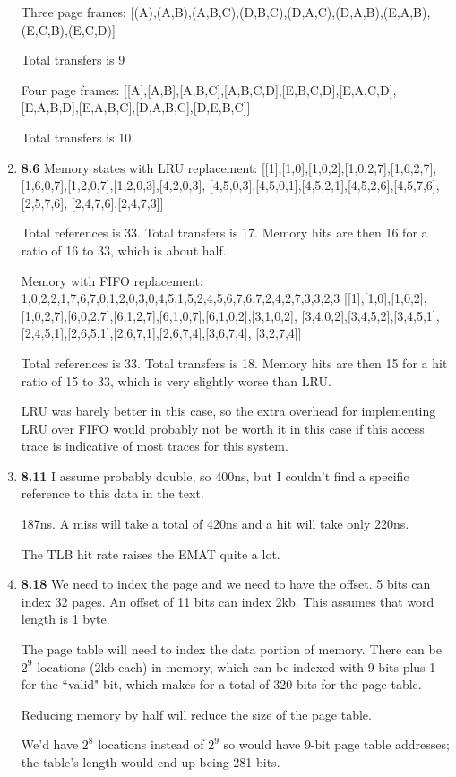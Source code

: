 \documentclass{article}
\begin{document}
\begin{enumerate}
Three page frames:
[(A),(A,B),(A,B,C),(D,B,C),(D,A,C),(D,A,B),(E,A,B),(E,C,B),(E,C,D)]

Total transfers is 9

Four page frames:
[[A],[A,B],[A,B,C],[A,B,C,D],[E,B,C,D],[E,A,C,D],[E,A,B,D],[E,A,B,C],[D,A,B,C],[D,E,B,C]]

Total transfers is 10


\item{\textbf{8.6}}
Memory states with LRU replacement:
[[1],[1,0],[1,0,2],[1,0,2,7],[1,6,2,7],[1,6,0,7],[1,2,0,7],[1,2,0,3],[4,2,0,3],
 [4,5,0,3],[4,5,0,1],[4,5,2,1],[4,5,2,6],[4,5,7,6],[2,5,7,6],
 [2,4,7,6],[2,4,7,3]]

Total references is 33. Total transfers is 17. Memory hits are then 16 for a
ratio of 16 to 33, which is about half.

Memory with FIFO replacement:
1,0,2,2,1,7,6,7,0,1,2,0,3,0,4,5,1,5,2,4,5,6,7,6,7,2,4,2,7,3,3,2,3
[[1],[1,0],[1,0,2],[1,0,2,7],[6,0,2,7],[6,1,2,7],[6,1,0,7],[6,1,0,2],[3,1,0,2],
 [3,4,0,2],[3,4,5,2],[3,4,5,1],[2,4,5,1],[2,6,5,1],[2,6,7,1],[2,6,7,4],[3,6,7,4],
 [3,2,7,4]]

Total references is 33. Total transfers is 18. Memory hits are then 15 for a
hit ratio of 15 to 33, which is very slightly worse than LRU.

LRU was barely better in this case, so the extra overhead for implementing LRU
over FIFO would probably not be worth it in this case if this access trace is
indicative of most traces for this system.

\item{\textbf{8.11}}
I assume probably double, so 400ns, but I couldn't find a specific reference to
this data in the text.

187ns. A miss will take a total of 420ns and a hit will take only 220ns.

The TLB hit rate raises the EMAT quite a lot.

\item{\textbf{8.18}}
We need to index the page and we need to have the offset. 5 bits can index 32
pages. An offset of 11 bits can index 2kb. This assumes that word length is 1
byte.

The page table will need to index the data portion of memory. There can be
$2^9$ locations (2kb each) in memory, which can be indexed with 9 bits plus 1
for the ``valid" bit, which makes for a total of 320 bits for the page table.

Reducing memory by half will reduce the size of the page table.

We'd have $2^8$ locations instead of $2^9$ so would have 9-bit page table
addresses; the table's length would end up being 281 bits.

\end{enumerate}
\end{document}

